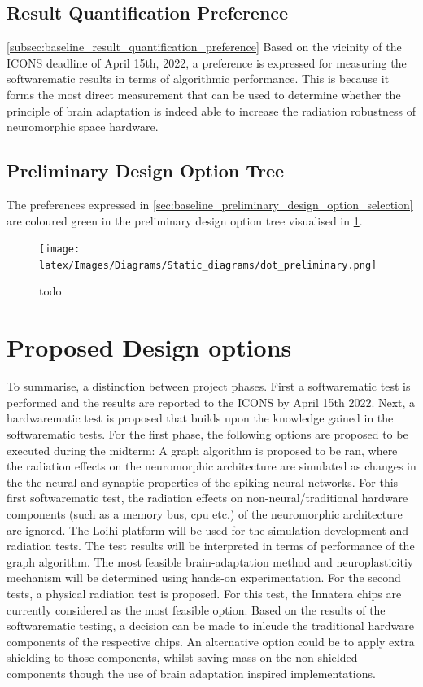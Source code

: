 \subsection{Result Quantification Preference}\cref{subsec:baseline_result_quantification_preference}
Based on the vicinity of the ICONS deadline of April 15th, 2022, a preference is expressed for measuring the softwarematic results in terms of algorithmic performance. This is because it forms the most direct measurement that can be used to determine whether the principle of brain adaptation is indeed able to increase the radiation robustness of neuromorphic space hardware.

\subsection{Preliminary Design Option Tree}\label{subsec:preliminary_design_option_tree}
The preferences expressed in \cref{sec:baseline_preliminary_design_option_selection} are coloured green in the preliminary design option tree visualised in \cref{fig:baseline_preliminary_dot}.

\begin{figure}[H]
    \centering
    \texttt{[image: latex/Images/Diagrams/Static\_diagrams/dot\_preliminary.png]}
    \caption{todo}
    \label{fig:baseline_preliminary_dot}
\end{figure}

\section{Proposed Design options}\label{subsec:baseline_proposed_design options.}
To summarise, a distinction between project phases. First a softwarematic test is performed and the results are reported to the ICONS by  April 15th 2022. Next, a hardwarematic test is proposed that builds upon the knowledge gained in the softwarematic tests. For the first phase, the following options are proposed to be executed during the midterm: A graph algorithm is proposed to be ran, where the radiation effects on the neuromorphic architecture are simulated as changes in the the neural and synaptic properties of the spiking neural networks. For this first softwarematic test, the radiation effects on non-neural/traditional hardware components (such as a memory bus, \acrshort{cpu} etc.) of the neuromorphic architecture are ignored. The Loihi platform will be used for the simulation development and radiation tests. The test results will be interpreted in terms of performance of the graph algorithm. The most feasible brain-adaptation method and neuroplasticitiy mechanism will be determined using hands-on experimentation.
For the second tests, a physical radiation test is proposed. For this test, the Innatera chips are currently considered as the most feasible option. Based on the results of the softwarematic testing, a decision can be made to inlcude the traditional hardware components of the respective chips. An alternative option could be to apply extra shielding to those components, whilst saving mass on the non-shielded components though the use of brain adaptation inspired implementations.
